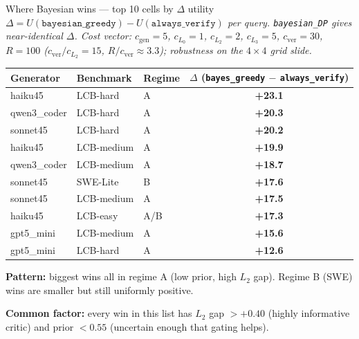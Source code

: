 \documentclass[10pt]{beamer}
\newcommand{\good}[1]{\textcolor{accentGreen}{\textbf{#1}}}
\newcommand{\info}[1]{\textcolor{primaryBlue}{\textbf{#1}}}
\begin{document}
\begin{frame}{Where Bayesian wins --- top 10 cells by $\Delta$ utility}
\vspace{0.02cm}
{\scriptsize\itshape
$\Delta = U(\texttt{bayesian\_greedy}) - U(\texttt{always\_verify})$
per query. \texttt{bayesian\_DP} gives near-identical $\Delta$. Cost
vector: $c_\mathrm{gen}{=}5$, $c_{L_0}{=}1$, $c_{L_2}{=}2$, $c_{L_3}{=}5$,
$c_\mathrm{ver}{=}30$, $R{=}100$ ($c_\mathrm{ver}/c_{L_2}{=}15$,
$R/c_\mathrm{ver}{\approx}3.3$); robustness on the $4{\times}4$ grid slide.}
\vspace{0.05cm}
\begin{table}
\centering
\small
\begin{tabular}{lllc}
\toprule
\rowcolor{paleBlue}\textbf{Generator} & \textbf{Benchmark} & \textbf{Regime} & \textbf{$\Delta$ (\texttt{bayes\_greedy} $-$ \texttt{always\_verify})} \\
\midrule
\rowcolor{paleGreen}haiku45 & LCB-hard & A & \good{+23.1} \\
\rowcolor{paleGreen}qwen3\_coder & LCB-hard & A & \good{+20.3} \\
\rowcolor{paleGreen}sonnet45 & LCB-hard & A & \good{+20.2} \\
\rowcolor{paleGreen}haiku45 & LCB-medium & A & \good{+19.9} \\
\rowcolor{paleGreen}qwen3\_coder & LCB-medium & A & \good{+18.7} \\
\rowcolor{paleGreen}sonnet45 & SWE-Lite & B & \good{+17.6} \\
\rowcolor{paleGreen}sonnet45 & LCB-medium & A & \good{+17.5} \\
\rowcolor{paleGreen}haiku45 & LCB-easy & A/B & \good{+17.3} \\
\rowcolor{paleGreen}gpt5\_mini & LCB-medium & A & \good{+15.6} \\
\rowcolor{paleGreen}gpt5\_mini & LCB-hard & A & \good{+12.6} \\
\bottomrule
\end{tabular}
\end{table}
\vspace{0.2cm}
\info{Pattern:} biggest wins all in regime A (low prior, high $L_2$ gap).
Regime B (SWE) wins are smaller but still uniformly positive.

\info{Common factor:} every win in this list has $L_2$ gap $> +0.40$ (highly
informative critic) and prior $< 0.55$ (uncertain enough that gating helps).
\end{frame}
\end{document}
